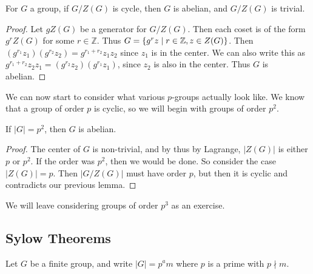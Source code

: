 \documentclass[a4paper]{scrartcl}
\begin{document}
\begin{lemma}
	For $G$ a group, if $G/Z(G)$ is cycle, then $G$ is abelian, and $G/Z(G)$ is trivial.
\end{lemma}
\begin{proof}
	Let $gZ(G)$ be a generator for $G/Z(G)$. Then each coset is of the form $g^r Z(G)$ for some $r \in \mathbb{Z}$. Thus $G = \{g^r z \mid r \in \mathbb{Z}, z \in Z(G) \}$.
	Then $(g^{r_1} z_1)(g^{r_2}z_2) = g^{r_1 + r_2} z_1 z_2$ since $z_1$ is in the center.
	We can also write this as $g^{r_1 + r_2}z_2 z_1 =  (g^{r_2} z_2)(g^{r_1} z_1)$, since $z_2$ is also in the center. Thus $G$ is abelian.
\end{proof}

We can now start to consider what various $p$-groups actually look like. We know that a group of order $p$ is cyclic, so we will begin with groups of order $p^2$.

\begin{corollary}
	If $|G| = p^2$, then $G$ is abelian.
\end{corollary}
\begin{proof}
	The center of $G$ is non-trivial, and by thus by Lagrange, $|Z(G)|$ is either $p$ or $p^2$. If the order was $p^2$, then we would be done. So consider the case $|Z(G)| = p$. Then $|G/Z(G)|$ must have order $p$, but then it is cyclic and contradicts our previous lemma.
\end{proof}

We will leave considering groups of order $p^3$ as an exercise.

\subsection{Sylow Theorems}

Let $G$ be a finite group, and write $|G| = p^a m$ where $p$ is a prime with $p \nmid m$.
\end{document}
